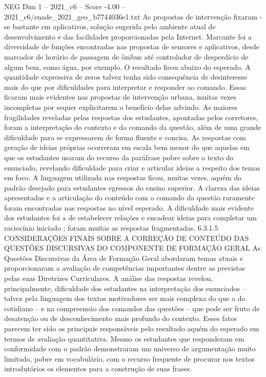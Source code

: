 \begin{textsample}{NEG Dim 1 – 2021\_c6 – Score -4.00 – 2021\_c6/enade\_2021\_geo\_b7744036e1.txt}
As propostas de intervenção fixaram -se bastante em aplicativos, solução sugerida pelo ambiente atual de desenvolvimento e das facilidades proporcionadas pela Internet.
Marcante foi a diversidade de funções encontradas nas propostas de sensores e aplicativos, desde marcador de horário de passagem de ônibus até controlador de desperdício de algum bem, como água, por exemplo.
O resultado ficou abaixo do esperado.
A quantidade expressiva de zeros talvez tenha sido consequência de desinteresse mais do que por dificuldades para interpretar e responder ao comando.
Essas ficaram mais evidentes nas propostas de intervenção urbana, muitas vezes incompletas por sequer explicitarem o benefício delas advindo.
As maiores fragilidades reveladas pelas respostas dos estudantes, apontadas pelos corretores, foram a interpretação do contexto e do comando da questão, além de uma grande dificuldade para se expressarem de forma fluente e concisa.
As respostas com geração de ideias próprias ocorreram em escala bem menor do que aquelas em que os estudantes usaram do recurso da paráfrase pobre sobre o texto do enunciado, revelando dificuldade para criar e articular ideias a respeito dos temas em foco.
A linguagem utilizada nas respostas ficou, muitas vezes, aquém do padrão desejado para estudantes egressos do ensino superior.
A clareza das ideias apresentadas e a articulação do conteúdo com o comando da questão raramente foram encontradas nas respostas no nível esperado.
A dificuldade mais evidente dos estudantes foi a de estabelecer relações e encadear ideias para completar um raciocínio iniciado ; foram muitas as respostas fragmentadas. 6.3.1.5 CONSIDERAÇÕES FINAIS SOBRE A CORREÇÃO DE CONTEÚDO DAS QUESTÕES DISCURSIVAS DO COMPONENTE DE FORMAÇÃO GERAL As Questões Discursivas da Área de Formação Geral abordaram temas atuais e proporcionaram a avaliação de competências importantes dentre as previstas pelas suas Diretrizes Curriculares.
A análise das respostas revelou, principalmente, dificuldade dos estudantes na interpretação dos enunciados – talvez pela linguagem dos textos motivadores ser mais complexa do que a do cotidiano – e na compreensão dos comandos das questões – que pode ser fruto de desatenção ou de desconhecimento mais profundo do contexto.
Esses fatos parecem ter sido os principais responsáveis pelo resultado aquém do esperado em termos de avaliação quantitativa.
Mesmo os estudantes que responderam em conformidade com o padrão demonstraram um universo de argumentação muito limitado, pobre em vocabulário, com o recurso frequente de procurar nos textos introdutórios os elementos para a construção de suas frases.

\end{textsample}
